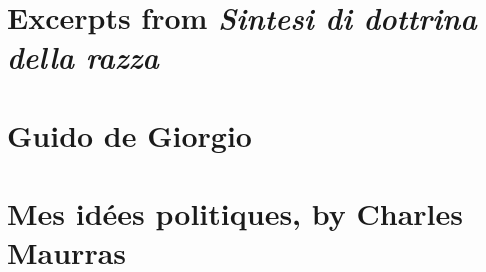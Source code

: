 \documentclass[a4paper,12pt,twoside]{book}
\begin{document}
\chapter{Excerpts from \textit{Sintesi di dottrina della razza}}
























\chapter{Guido de Giorgio}












\chapter{Mes idées politiques, by Charles Maurras}











\end{document}
